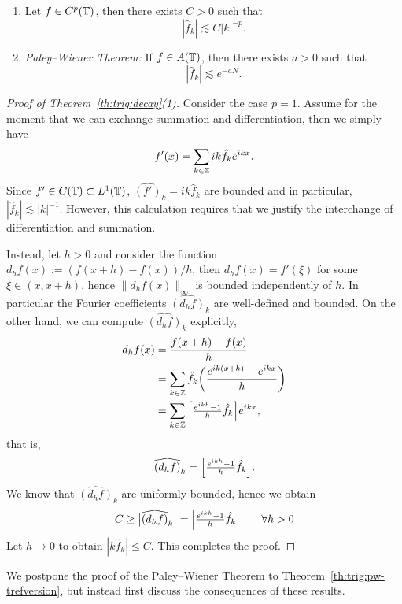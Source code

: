 \begin{theorem} \label{th:trig:decay}
  \begin{enumerate} \ilist
    \item Let $f \in C^{p}(\mathbb{T})$, then there exists $C > 0$ such that
    \[
        |\hat{f}_k| \lesssim C |k|^{-p}.
    \]
    \item {\it Paley--Wiener Theorem:} If $f \in A(\mathbb{T})$, then there exists
    $a > 0$ such that
    \[
        |\hat{f}_k| \lesssim e^{-a N}.
    \]
  \end{enumerate}
\end{theorem}
\begin{proof}[Proof of Theorem~\ref{th:trig:decay}(1)]
  Consider the case $p = 1$. Assume for the moment that we can exchange
  summation and differentiation, then we simply have
  \[
    f'(x) = \sum_{k \in \mathbb{Z}} ik \hat{f}_k e^{ikx}.
  \]
  Since $f' \in C(\mathbb{T}) \subset L^1(\mathbb{T})$, $\hat{(f')}_k = ik \hat{f}_k$ are
  bounded and in particular, $|\hat{f}_k| \lesssim |k|^{-1}$. However, this
  calculation requires that we justify the interchange of differentiation
  and summation.

  Instead, let $h > 0$ and consider the function $d_hf(x) :=
  (f(x+h)-f(x)) / h$, then $d_h f(x) = f'(\xi)$ for some $\xi \in (x, x+h)$,
  hence $\|d_h f(x)\|_{\infty}$ is bounded independently of $h$. In particular
  the Fourier coefficients $\widehat{(d_h f)}_k$ are well-defined and bounded.
  On the other hand, we can compute $\widehat{(d_h f)}_k$ explicitly,
  \begin{align*}
    d_hf(x)
      &= \frac{f(x+h)-f(x)}{h} \\
      &= \sum_{k \in \mathbb{Z}} \hat{f}_k \bigg( \frac{e^{i k (x+h)} - e^{ikx}}{h} \bigg) \\
      &= \sum_{k \in \mathbb{Z}} \Big[{\textstyle \frac{e^{ikh} - 1}{h}} \hat{f}_k\Big] e^{ikx},
  \end{align*}
  that is,
  \[
    \widehat{(d_h f)}_k = \Big[{\textstyle \frac{e^{ikh} - 1}{h}} \hat{f}_k\Big].
  \]
  We know that $\widehat{(d_h f)}_k$ are uniformly bounded, hence we obtain
  \[
    C \geq \big|\widehat{(d_h f)}_k\big|
      = \Big| {\textstyle \frac{e^{ikh} - 1}{h}} \hat{f}_k \Big| \qquad \forall h > 0
  \]
  Let $h \to 0$ to obtain $|k \hat{f}_k| \leq C$. This completes the proof.
\end{proof}

We postpone the proof of the Paley--Wiener Theorem to
Theorem~\ref{th:trig:pw-trefversion}, but instead first discuss the consequences
of these results.


